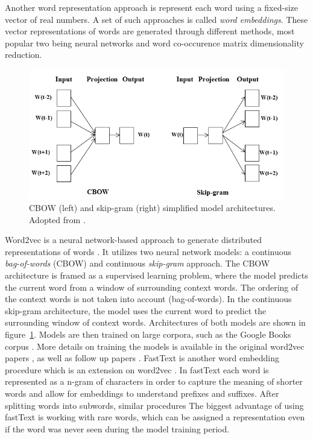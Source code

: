Another word representation approach is represent each word using a fixed-size
vector of real numbers.  A set of such approaches is called \textit{word
embeddings}. These vector representations of words are generated through
different methods, most popular two being neural networks and word co-occurence
matrix dimensionality reduction.

\begin{figure}
	\includegraphics[scale=0.65]{skip_gram_cbow.png}
	\caption{CBOW (left) and skip-gram (right) simplified model architectures. Adopted from 
	\citep{suleiman2017deep}. }
	\label{fig:skip_gram_cbow}
\end{figure}

Word2vec is a neural network-based approach to generate distributed
representations of words \citep{mikolov2013distributed}.  It utilizes two
neural network models: a continuous \textit{bag-of-words} (CBOW) and continuous
\textit{skip-gram} approach.  The CBOW architecture is framed as a supervised
learning problem, where the model predicts the current word from a window of
surrounding context words. 
The ordering of the context words is not taken into
account (bag-of-words).  In the continuous skip-gram architecture, the model
uses the current word to predict the surrounding window of context words.
Architectures of both models are shown in figure~\ref{fig:skip_gram_cbow}. 
Models are then trained on large corpora, such as the Google Books corpus 
\citep{lin2012syntactic}. 
More details on training the models is available in the original word2vec papers
\citep{mikolov2013distributed, mikolov2013efficient}, as well as follow up papers
\citep{goldberg2014word2vec, rong2014word2vec}.
FastText is another word embedding procedure which is an extension on word2vec
\citep{bojanowski2017enriching}. In fastText each word is represented as a
n-gram of characters in order to capture the meaning of shorter words and allow
for embeddings to understand prefixes and suffixes. After splitting words into
subwords, similar procedures The biggest advantage of using fastText is working
with rare words, which can be assigned a representation even if the word was
never seen during the model training period. 

